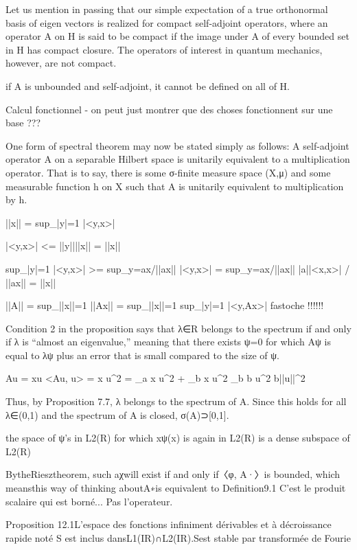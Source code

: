 Let us mention in passing that our simple expectation of a true
orthonormal basis of eigen vectors is realized for compact
self-adjoint operators, where an operator A on H is said to be
compact if the image under A of every bounded set in H has
compact closure.
The operators of interest in quantum mechanics, however,
are not compact.

if A is unbounded and self-adjoint, it cannot be defined on all of H.

Calcul fonctionnel - on peut just montrer que des choses fonctionnent
sur une base ???

One form of spectral theorem may now be stated simply as follows:
A self-adjoint operator A on a separable Hilbert space is unitarily
equivalent to a multiplication operator. That is to say, there is some
σ-finite measure space (X,μ) and some measurable function h on X
such that A is unitarily equivalent to multiplication by h.



||x|| = sup_{|y|=1} |<y,x>|

|<y,x>| <= ||y||||x|| = ||x||

sup_{|y|=1} |<y,x>| >= sup_{y=ax/||ax||} |<y,x>|
= sup_{y=ax/||ax||} |a||<x,x>| / ||ax|| = ||x||

||A|| = sup_{||x||=1} ||Ax|| = sup_{||x||=1} sup_{|y|=1} |<y,Ax>|
fastoche !!!!!!





Condition 2 in the proposition says that λ∈R belongs to the spectrum
if and only if λ is “almost an eigenvalue,” meaning that there
exists ψ=0 for which Aψ is equal to λψ plus an error that is small
compared to the size of ψ.



Au = xu
<Au, u> = \int x u^2 = \int_a x u^2 + \int_b x u^2
\geq \int_b b u^2 \geq b||u||^2



Thus, by Proposition 7.7, λ belongs to the spectrum of A.
Since this holds for all λ∈(0,1) and the spectrum of A is
closed, σ(A)⊃[0,1].



the space of ψ’s in L2(R) for which xψ(x) is again in L2(R)
is a dense subspace of L2(R)


BytheRiesztheorem, such aχwill exist if and only if〈φ, A·〉is bounded, which meansthis way of thinking aboutA∗is equivalent to Definition9.1
C'est le produit scalaire qui est borné... Pas l'operateur.


Proposition 12.1L’espace des fonctions infiniment dérivables et à
décroissance rapide noté S est inclus dansL1(IR)∩L2(IR).Sest stable par
transformée de Fourie


